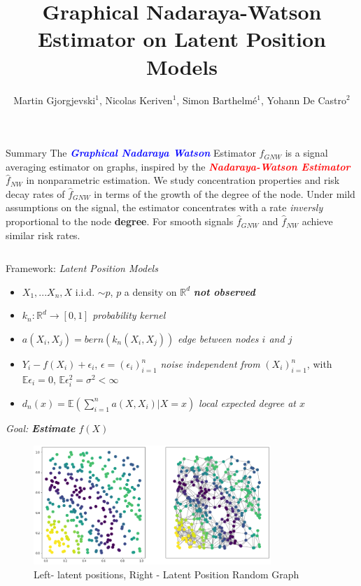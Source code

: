 \documentclass[final,dvipsnames]{beamer}
\title{Graphical Nadaraya-Watson Estimator on Latent Position Models}
\author{Martin Gjorgjevski$^1$, Nicolas Keriven$^1$, Simon Barthelmé$^1$, Yohann De Castro$^2$}
\institute{$^1$CNRS, Gipsa-Lab, Grenoble, $^2$École Centrale Lyon, Lyon}
\makeatletter
\newcommand{\myemphh}[1]{\textbf{\textcolor{blue}{#1}}}
\newcommand{\myemphr}[1]{\textbf{\textcolor{red}{#1}}}
\newcommand{\mycolbackgreen}[1]{
\hspace*{.01\linewidth}\begin{minipage}{.35\linewidth}
\begin{mdframed}[backgroundcolor=green!10,linewidth=1pt]
\vspace{10pt}
#1
\vspace{10pt}
\end{mdframed}
\end{minipage}
}
\newcommand*{\rom}[1]{\expandafter\@slowromancap\romannumeral #1@}
\makeatother
\begin{document}
\begin{frame}

\begin{block}{Summary}
    The \textit{\myemphh{Graphical Nadaraya Watson}} Estimator $\hat{f}_{GNW}$ is a signal averaging estimator on graphs, inspired by the \textit{\myemphr{Nadaraya-Watson Estimator}} $\hat{f}_{NW}$ in nonparametric estimation. 
    We study concentration properties and risk decay rates of $\hat{f}_{GNW}$ in terms of the growth of the degree of the node. Under mild assumptions on the signal, the estimator concentrates with a rate \textit{inversly} proportional to the node \textbf{degree}. For smooth signals $\hat{f}_{GNW}$ and $\hat{f}_{NW}$ achieve similar risk rates.    
\end{block}    

\begin{columns}[T]

    

\begin{column}{0.49\textwidth}
\begin{block}{Framework: \textit{Latent Position Models} \hspace*{\fill}{\large{\rom{1}}\qquad}}
\begin{itemize}
\item $X_1,...X_n,X$ i.i.d. $\sim p$, $p$ a density on $\mathbb{R}^d$ 
\textit{\textbf{not observed}}
\vspace{10pt}
\item $k_n:\mathbb{R}^d\to [0,1]$ \textit{probability kernel} 
\vspace{10pt}
\item $a(X_i,X_j)=bern(k_n(X_i,X_j))$ \textit{edge between nodes $i$ and $j$}
\vspace{10pt}
\item $Y_i-f(X_i)+\epsilon_i$, $\epsilon=(\epsilon_i)_{i=1}^n$ \textit{noise independent from} $(X_i)_{i=1}^n$, with $\mathbb{E}\epsilon_i=0$, $\mathbb{E}\epsilon_i^2
=\sigma^2<\infty$ 
\vspace{10pt}
\item $d_n(x)=\mathbb{E}(\sum_{i=1}^n a(X,X_i)|X=x)$ \textit{local expected degree at $x$}
\end{itemize}
\vspace{20pt}
\mycolbackgreen{
    \textit{Goal: \textbf{Estimate} $f(X)$}
}
\begin{figure}
    \centering
    \includegraphics[width=0.8\textwidth]{lpm_image_correct.png}
    \caption{Left- latent positions, Right - Latent Position Random Graph}
    \label{fig:my_label}
    \end{figure}



\end{block}
\end{column}
\end{columns}
\end{frame}
\end{document}
